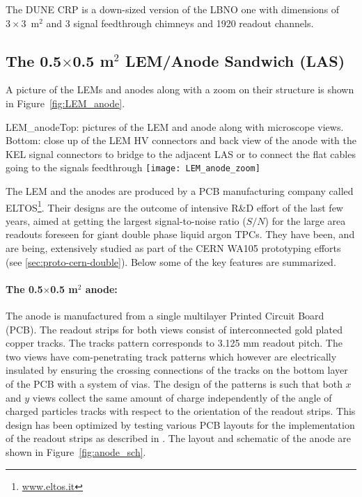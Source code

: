 The DUNE CRP is a down-sized version of the LBNO one with  dimensions of $3\times3$~m$^2$ and 3 signal feedthrough chimneys and 1920 readout channels.

\subsection{The 0.5$\times$0.5 m$^2$  LEM/Anode Sandwich (LAS)}

A picture of the LEMs and anodes along with a zoom on  their structure is shown in Figure~\ref{fig:LEM_anode}.

\begin{cdrfigure}{LEM_anode}{Top: pictures of the LEM and anode along with microscope
  views. Bottom: close up of the LEM HV connectors and back view of the anode with the KEL signal connectors to bridge to the adjacent LAS or to connect the flat cables going to the signals feedthrough}
 \texttt{[image: LEM\_anode\_zoom]}  
 \end{cdrfigure}

The LEM and the anodes are produced by a PCB manufacturing company called  ELTOS\footnote{\url{www.eltos.it}}. Their designs are the outcome of intensive R\&D effort of the last few years, aimed at getting the  largest signal-to-noise ratio ($S/N$) for the large area readouts  foreseen for giant double phase liquid argon TPCs. They have been, and are being, extensively studied as part of the CERN WA105  prototyping efforts (see \ref{sec:proto-cern-double}). Below some of the key features are summarized.

 \paragraph{The 0.5$\times$0.5 m$^2$ anode:}
The anode is manufactured from a single multilayer Printed Circuit Board (PCB). The  readout strips for both views consist of interconnected gold plated copper tracks. The tracks pattern corresponds to 3.125 mm readout pitch. The two views have com-penetrating track patterns which however are electrically insulated by ensuring the crossing connections of the tracks on the bottom layer of the PCB with a system of vias. The design of the patterns is such that  both $x$ and $y$ views collect the same amount of charge  independently of the angle of charged particles tracks with respect to the orientation of the readout strips. This design has been optimized by testing various PCB layouts for the implementation of the readout strips as described in \cite{Cantini:2013yba}.  The layout and  schematic of the anode are shown in Figure~\ref{fig:anode_sch}.  

